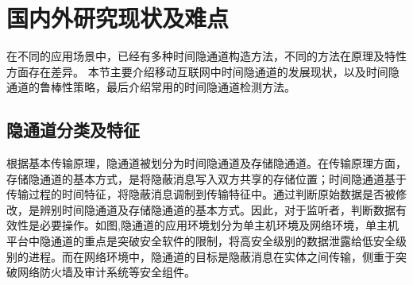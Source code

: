 \section{国内外研究现状及难点}
\label{sec:intro:background}

在不同的应用场景中，已经有多种时间隐通道构造方法，不同的方法在原理及特性方面存在差异。
本节主要介绍移动互联网中时间隐通道的发展现状，以及时间隐通道的鲁棒性策略，最后介绍常用的时间隐通道检测方法。

\subsection{隐通道分类及特征}
\label{sec:intro:background:covert-channel}


根据基本传输原理，隐通道被划分为时间隐通道及存储隐通道。在传输原理方面，存储隐通道的基本方式，是将隐蔽消息写入双方共享的存储位置；时间隐通道基于传输过程的时间特征，将隐蔽消息调制到传输特征中。通过判断原始数据是否被修改，是辨别时间隐通道及存储隐通道的基本方式。因此，对于监听者，判断数据有效性是必要操作。如图,隐通道的应用环境划分为单主机环境及网络环境，单主机平台中隐通道的重点是突破安全软件的限制，将高安全级别的数据泄露给低安全级别的进程。而在网络环境中，隐通道的目标是隐蔽消息在实体之间传输，侧重于突破网络防火墙及审计系统等安全组件。

